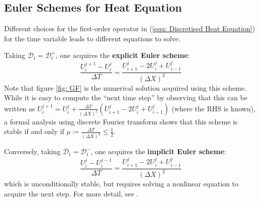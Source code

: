 \documentclass[../dissertation.tex]{subfiles}
\begin{document}
\subsection{Euler Schemes for Heat Equation}
\label{sct: Euler Schemes for Heat Equation}
Different choices for the first-order operator in (\ref{equ: Discretised Heat Equation}) for the time variable leads to different equations to solve.

Taking $\mathcal{D}_t = \mathcal{D}_t^+$, one acquires the \textbf{explicit Euler scheme}:
\begin{equation}
    \frac{U_{i}^{j+1} - U_{i}^j}{\Delta T} = \frac{U_{i+1}^j - 2 U_{i}^{j} + U_{i-1}^j}{\left( \Delta X \right)^2}
\end{equation}
Note that figure \ref{fig: GF} is the numerical solution acquired using this scheme.
While it is easy to compute the ``next time step'' by observing that this can be written as $U_{i}^{j+1} = U_{i}^j + \frac{\Delta T}{\left( \Delta X \right)^2} \left( U_{i+1}^j - 2 U_{i}^j + U_{i-1}^{j} \right)$
(where the RHS is known),
a formal analysis using discrete Fourier transform shows that this scheme is stable if and only if $\mu \coloneqq \frac{\Delta T}{\left( \Delta X \right)^2} \leq \frac{1}{2}$.

Conversely, taking $\mathcal{D}_t = \mathcal{D}_t^-$, one acquires the \textbf{implicit Euler scheme}:
\begin{equation}
    \frac{U_{i}^{j} - U_{i}^{j-1}}{\Delta T} = \frac{U_{i+1}^j - 2 U_{i}^{j} + U_{i-1}^j}{\left( \Delta X \right)^2}
\end{equation}
which is unconditionally stable, but requires solving a nonlinear equation to acquire the next step.
For more detail, see \cite{nspde}.
\end{document}
